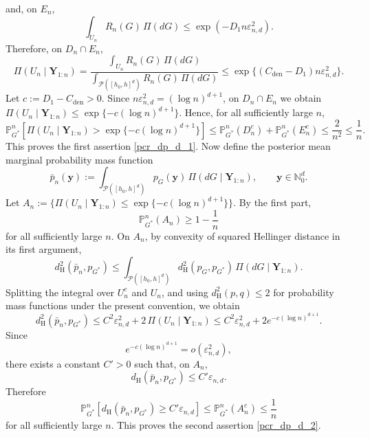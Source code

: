 \documentclass[twoside,12pt]{article}
\renewcommand{\P}{\mathds{P}}
\begin{document}
and, on $E_n$,
\begin{displaymath}
\int_{U_n}R_n(G)\,\Pi(dG)\le\exp(-D_1n\varepsilon_{n,d}^2).
\end{displaymath}
Therefore, on $D_n\cap E_n$,
\begin{displaymath}
\Pi(U_n\mid \boldsymbol Y_{1:n})=\frac{\int_{U_n}R_n(G)\,\Pi(dG)}{\int_{\mathcal P([h_0,h]^d)}R_n(G)\,\Pi(dG)}\le\exp\{(C_{\mathrm{den}}-D_1)n\varepsilon_{n,d}^2\}.
\end{displaymath}
Let $c:=D_1-C_{\mathrm{den}}>0$. Since $n\varepsilon_{n,d}^2=(\log n)^{d+1}$, on $D_n\cap E_n$ we obtain $\Pi(U_n\mid \boldsymbol Y_{1:n})\le\exp\{-c(\log n)^{d+1}\}$.
Hence, for all sufficiently large $n$,
\begin{displaymath}
\P_{G^\ast}^n\!\left[\Pi(U_n\mid \boldsymbol Y_{1:n})>\exp\{-c(\log n)^{d+1}\}\right]\le\P_{G^\ast}^n(D_n^c)+\P_{G^\ast}^n(E_n^c)\le\frac{2}{n^2}\le\frac{1}{n}.
\end{displaymath}
This proves the first assertion \eqref{pcr_dp_d_1}. Now define the posterior mean marginal probability mass function
\begin{displaymath}
\bar p_n(\boldsymbol y):=
\int_{\mathcal P([h_0,h]^d)}
p_G(\boldsymbol y)\,\Pi(dG\mid \boldsymbol Y_{1:n}),\qquad\boldsymbol y\in\mathbb N_0^d.
\end{displaymath}
Let $A_n:=\{\Pi(U_n\mid \boldsymbol Y_{1:n})\le\exp\{-c(\log n)^{d+1}\}\}$. By the first part,
\begin{displaymath}
\P_{G^\ast}^n(A_n)\ge 1-\frac{1}{n}
\end{displaymath}
for all sufficiently large $n$. On $A_n$, by convexity of squared Hellinger distance in its first argument,
\begin{displaymath}
d_{\mathrm H}^2(\bar p_n,p_{G^\ast})\le\int_{\mathcal P([h_0,h]^d)}d_{\mathrm H}^2(p_G,p_{G^\ast})\,\Pi(dG\mid \boldsymbol Y_{1:n}).
\end{displaymath}
Splitting the integral over $U_n^c$ and $U_n$, and using $d_{\mathrm H}^2(p,q)\le 2$ for probability mass functions under the present convention, we obtain
\begin{displaymath}
d_{\mathrm H}^2(\bar p_n,p_{G^\ast})\le C^2\varepsilon_{n,d}^2+2\,\Pi(U_n\mid \boldsymbol Y_{1:n})\le C^2\varepsilon_{n,d}^2+2e^{-c(\log n)^{d+1}}.
\end{displaymath}
Since
\begin{displaymath}
e^{-c(\log n)^{d+1}}=o(\varepsilon_{n,d}^2),
\end{displaymath}
there exists a constant $C'>0$ such that, on $A_n$,
\begin{displaymath}
d_{\mathrm H}(\bar p_n,p_{G^\ast})\le C'\varepsilon_{n,d}.
\end{displaymath}
Therefore
\begin{displaymath}
\P_{G^\ast}^n\!\left[d_{\mathrm H}(\bar p_n,p_{G^\ast})\ge C'\varepsilon_{n,d}\right]\le\P_{G^\ast}^n(A_n^c)\le\frac{1}{n}
\end{displaymath}
for all sufficiently large $n$. This proves the second assertion \eqref{pcr_dp_d_2}.
\end{document}
